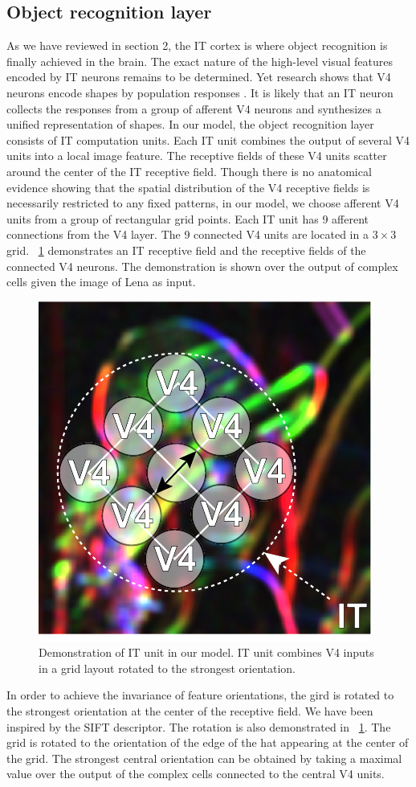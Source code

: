 \documentclass[5p]{elsarticle}
\begin{document}
\subsection{Object recognition layer}

As we have reviewed in section 2,
the IT cortex is where object recognition is finally achieved in the brain.
The exact nature of the high-level visual features 
encoded by IT neurons remains to be determined.
Yet research shows that V4 neurons encode shapes by population responses \cite{pasupathy2002}.
It is likely that an IT neuron collects the responses from a group of afferent V4 neurons 
and synthesizes a unified representation of shapes.
In our model, the object recognition layer consists of IT computation units.
Each IT unit combines the output of several V4 units into a local image feature.
The receptive fields of these V4 units scatter around the center of the IT receptive field.
Though there is no anatomical evidence showing that 
the spatial distribution of the V4 receptive fields 
is necessarily restricted to any fixed patterns,
in our model, we choose afferent V4 units from a group of rectangular grid points.
Each IT unit has 9 afferent connections from the V4 layer.
The 9 connected V4 units are located in a $3\times 3$ grid.
\figurename~\ref{fig:13} demonstrates an IT receptive field 
and the receptive fields of the connected V4 neurons.
The demonstration is shown over
the output of complex cells given the image of Lena as input.

\begin{figure}
\centering
\includegraphics[width=0.5\linewidth]{images/fig-13.pdf}
\caption{Demonstration of IT unit in our model. 
IT unit combines V4 inputs in a grid layout rotated to the strongest orientation.}
\label{fig:13}
\end{figure}

In order to achieve the invariance of feature orientations,
the gird is rotated to the strongest orientation at the center of the receptive field.
We have been inspired by the SIFT \cite{lowe1999} descriptor.
The rotation is also demonstrated in \figurename~\ref{fig:13}.
The grid is rotated to the orientation of the edge of the hat appearing at the center of the grid.
The strongest central orientation can be obtained by taking a maximal value 
over the output of the complex cells connected to the central V4 units.
\end{document}
